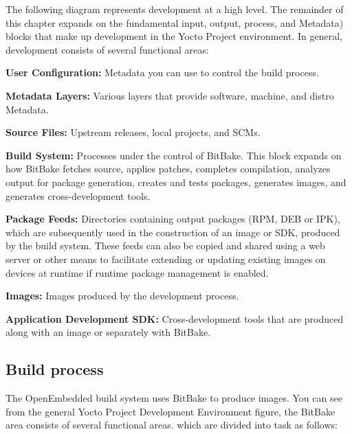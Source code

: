 The following diagram represents development at a high level. The remainder of this chapter expands on the fundamental input, output, process, and Metadata) blocks that make up development in the Yocto Project environment. In general, development consists of several functional areas\+:
\begin{DoxyItemize}
\item {\bfseries User Configuration\+:} Metadata you can use to control the build process.
\item {\bfseries Metadata Layers\+:} Various layers that provide software, machine, and distro Metadata.
\item {\bfseries Source Files\+:} Upstream releases, local projects, and S\+C\+Ms.
\item {\bfseries Build System\+:} Processes under the control of Bit\+Bake. This block expands on how Bit\+Bake fetches source, applies patches, completes compilation, analyzes output for package generation, creates and tests packages, generates images, and generates cross-\/development tools.
\item {\bfseries Package Feeds\+:} Directories containing output packages (R\+PM, D\+EB or I\+PK), which are subsequently used in the construction of an image or S\+DK, produced by the build system. These feeds can also be copied and shared using a web server or other means to facilitate extending or updating existing images on devices at runtime if runtime package management is enabled.
\item {\bfseries Images\+:} Images produced by the development process.
\item {\bfseries Application Development S\+DK\+:} Cross-\/development tools that are produced along with an image or separately with Bit\+Bake.
\end{DoxyItemize}

\subsection*{Build process}

The Open\+Embedded build system uses Bit\+Bake to produce images. You can see from the general Yocto Project Development Environment figure, the Bit\+Bake area consists of several functional areas. which are divided into task as follows\+:


